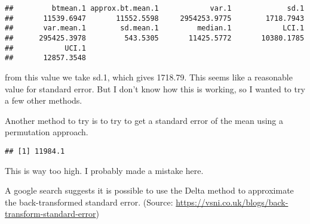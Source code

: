 \documentclass[
]{article}
\newenvironment{Shaded}{\begin{snugshade}}{\end{snugshade}}
\newcommand{\CommentTok}[1]{\textcolor[rgb]{0.56,0.35,0.01}{\textit{#1}}}
\newcommand{\ControlFlowTok}[1]{\textcolor[rgb]{0.13,0.29,0.53}{\textbf{#1}}}
\newcommand{\DecValTok}[1]{\textcolor[rgb]{0.00,0.00,0.81}{#1}}
\newcommand{\FunctionTok}[1]{\textcolor[rgb]{0.00,0.00,0.00}{#1}}
\newcommand{\NormalTok}[1]{#1}
\newcommand{\OtherTok}[1]{\textcolor[rgb]{0.56,0.35,0.01}{#1}}
\newcommand{\SpecialCharTok}[1]{\textcolor[rgb]{0.00,0.00,0.00}{#1}}
\begin{document}
\begin{verbatim}
##         btmean.1 approx.bt.mean.1            var.1             sd.1 
##       11539.6947       11552.5598     2954253.9775        1718.7943 
##       var.mean.1        sd.mean.1         median.1            LCI.1 
##      295425.3978         543.5305       11425.5772       10380.1785 
##            UCI.1 
##       12857.3548
\end{verbatim}

from this value we take sd.1, which gives 1718.79. This seems like a
reasonable value for standard error. But I don't know how this is
working, so I wanted to try a few other methods.

Another method to try is to try to get a standard error of the mean
using a permutation approach.

\begin{Shaded}
\end{Shaded}

\begin{verbatim}
## [1] 11984.1
\end{verbatim}

This is way too high. I probably made a mistake here.

A google search suggests it is possible to use the Delta method to
approximate the back-transformed standard error. (Source:
\url{https://vsni.co.uk/blogs/back-transform-standard-error})

\begin{Shaded}
\end{Shaded}
\end{document}
